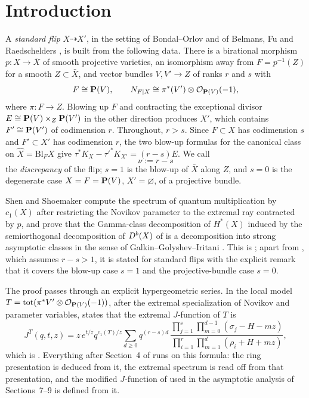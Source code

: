 \section{Introduction}

A \emph{standard flip} \(X\dashrightarrow X'\), in the setting of
Bondal--Orlov and of Belmans, Fu and Raedschelders \cite{BFR}, is built from
the following data.  There is a birational morphism \(p\colon X\to\bar X\)
of smooth projective varieties, an isomorphism away from \(F=p^{-1}(Z)\) for
a smooth \(Z\subset\bar X\), and vector bundles \(V,V'\to Z\) of ranks \(r\)
and \(s\) with
\[
  F\cong\mathbf P(V),\qquad
  N_{F|X}\cong\pi^{*}(V')\otimes\mathcal O_{\mathbf P(V)}(-1),
\]
where \(\pi\colon F\to Z\).  Blowing up \(F\) and contracting the exceptional
divisor \(E\cong\mathbf P(V)\times_{Z}\mathbf P(V')\) in the other direction produces
\(X'\), which contains \(F'\cong\mathbf P(V')\) of codimension \(r\).  Throughout,
\(r>s\).  Since \(F\subset X\) has codimension \(s\) and \(F'\subset X'\) has
codimension \(r\), the two blow-up formulas for the canonical class on
\(\widehat X=\mathrm{Bl}_{F}X\) give
\(\tau^{*}K_{X}-\tau'^{*}K_{X'}=(r-s)E\).  We call
\[
  \nu:=r-s
\]
the \emph{discrepancy} of the flip; \(s=1\) is the blow-up of \(\bar X\)
along \(Z\), and \(s=0\) is the degenerate case \(X=F=\mathbf P(V)\),
\(X'=\varnothing\), of a projective bundle.

Shen and Shoemaker \cite{SS} compute the spectrum of quantum multiplication
by \(c_{1}(X)\) after restricting the Novikov parameter to the extremal ray
contracted by \(p\), and prove that the Gamma-class decomposition of
\(H^{*}(X)\) induced by the semiorthogonal decomposition of \(D^{b}(X)\) of
\cite{BFR} is a decomposition into strong asymptotic classes in the sense of
Galkin--Golyshev--Iritani \cite{GGI}.  This is
\cite[Theorems~1.2, 1.4, 9.9 and~9.14, Corollary~1.5]{SS}; apart from
\cite[Theorem~1.2]{SS}, which assumes \(r-s>1\), it is stated for
standard flips with the explicit remark that it covers the blow-up case
\(s=1\) and the projective-bundle case \(s=0\).

The proof passes through an explicit hypergeometric series.  In the local
model \(T=\mathrm{tot}(\pi^{*}V'\otimes\mathcal O_{\mathbf P(V)}(-1))\), after the
extremal specialization \cite[(33)]{SS} of Novikov and parameter variables,
\cite[Theorem~4.4]{SS} states that the extremal \(J\)-function of \(T\) is
\begin{equation}
  \label{eq:ss35}
  J^{T}(q,t,z)
  = z\,e^{t/z}q^{c_{1}(T)/z}
    \sum_{d\ge0}q^{(r-s)d}\,
    \frac{\prod_{j=1}^{s}\prod_{m=0}^{d-1}(\sigma_{j}-H-mz)}
         {\prod_{i=1}^{r}\prod_{m=1}^{d}(\rho_{i}+H+mz)},
\end{equation}
which is \cite[(35)]{SS}.  Everything after Section~4 of \cite{SS} runs on
this formula: the ring presentation \cite[(37)]{SS} is deduced from it, the
extremal spectrum is read off from that presentation, and the modified
\(J\)-function of \cite[(39)--(40)]{SS} used in the asymptotic analysis of
Sections~7--9 is defined from it.

